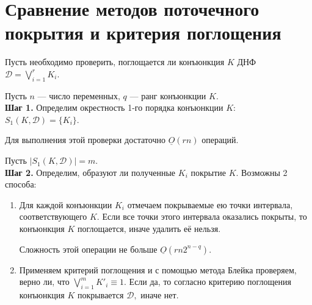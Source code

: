 \documentclass[12pt,a4paper,oneside,fleqn,leqno]{article}
\theoremstyle{definition}
\begin{document}
	\section{Сравнение методов поточечного покрытия и критерия поглощения}
		Пусть необходимо проверить, поглощается ли конъюнкция $K$ ДНФ $\mathcal{D} = \bigvee\limits_{i = 1}^r K_i.$\par
		Пусть $n$ --- число переменных, $q$ --- ранг конъюнкции $K.$\\
		\textbf{Шаг 1.} Определим окрестность 1-го порядка конъюнкции $K$: $S_1(K, \mathcal{D}) = \{K_i\}.$\par
		Для выполнения этой проверки достаточно $\underline{O}(rn)$ операций.\par
		Пусть $|S_1(K, \mathcal{D})| = m$.\\
		\textbf{Шаг 2.} Определим, образуют ли полученные $K_i$ покрытие $K.$ Возможны 2 способа:\par
		\begin{enumerate}
			\item
			Для каждой конъюнкции $K_i$ отмечаем покрываемые ею точки интервала, соответствующего $K.$ Если все точки этого интервала оказались покрыты, то конъюнкция $K$ поглощается, иначе удалить её нельзя.\par
			Сложность этой операции не больше $\underline{O}(rn2^{n-q})$.
			\item
			Применяем критерий поглощения и с помощью метода Блейка проверяем, верно ли, что $\bigvee\limits_{i = 1}^m K'_i \equiv 1.$ Если да, то согласно критерию поглощения конъюнкция $K$ покрывается $\mathcal{D},$ иначе нет.\par
		\end{enumerate}\par
\end{document}
